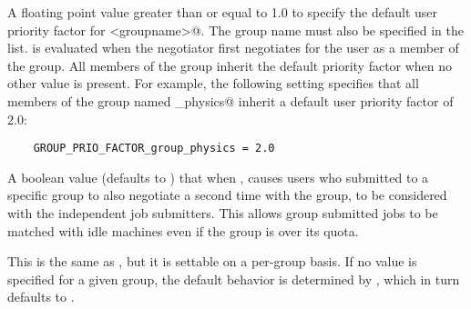 \begin{description}

\label{param:GroupPrioFactorGroupname}
\item[\Macro{GROUP\_PRIO\_FACTOR\_<groupname>}]
  A floating point value greater than or equal to 1.0 to specify the
  default user priority factor for \verb@<groupname>@. 
  The group name must also be specified in the  list.
   is evaluated when
  the negotiator first negotiates for the user as a member of the group.
  All members of the group inherit the default priority factor
  when no other value is present.
  For example, the following setting
  specifies that all members of the group named \verb@group_physics@
  inherit a default user priority factor of 2.0:
  \begin{verbatim}
    GROUP_PRIO_FACTOR_group_physics = 2.0
  \end{verbatim}

\label{param:GroupAutoregroup}
\item[\Macro{GROUP\_AUTOREGROUP}]
  A boolean value (defaults to ) that when ,
  causes users who submitted to a specific group to
  also negotiate a second time with the \verb@none@ group,
  to be considered with the independent job submitters. 
  This allows group submitted jobs to be matched with idle machines
  even if the group is over its quota.

\label{param:GroupAutoregroupGroupname}
\item[\Macro{GROUP\_AUTOREGROUP\_<groupname>}]
  This is the same as , but it is settable
  on a per-group basis.  If no value is specified for a given group,
  the default behavior is determined by ,
  which in turn defaults to .


\end{description}
